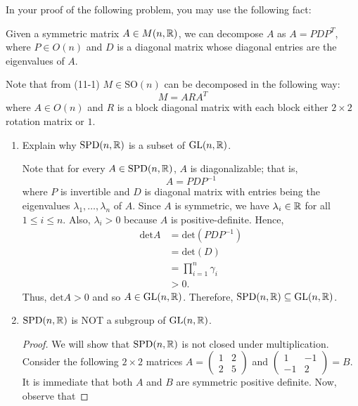 \documentclass{article}
\begin{document}
In your proof of the following problem, you may use the following fact:
\begin{theorem}[ ]
   Given a symmetric matrix \( A \in M(n,\mathbb{R}) \), we can decompose \( A  \) as \( A = P D P^{T} \), where \( P \in O(n) \) and \( D  \) is a diagonal matrix whose diagonal entries are the eigenvalues of \( A  \). 
\end{theorem}

\begin{problem}
    Note that from (11-1) \( M \in \text{SO}(n)   \) can be decomposed in the following way:
        \[ M = A R A^{T} \]
        where \( A \in O(n) \) and \( R  \) is a block diagonal matrix with each block either \( 2 \times 2  \) rotation matrix or \( 1 \).
\end{problem}
\begin{enumerate}
    \item[(a)] Explain why \( \text{SPD}(n,\mathbb{R})   \) is a subset of \( \text{GL}(n,\mathbb{R})  \).
        \begin{solution}
            Note that for every \( A \in \text{SPD}(n,\mathbb{R})   \), \( A  \) is diagonalizable; that is, 
            \[  A = P D P^{-1} \]
            where \( P  \) is invertible and \( D  \) is diagonal matrix with entries being the eigenvalues \( {\lambda}_{1}, \dots, {\lambda}_{n}  \) of \( A  \). Since \( A  \) is symmetric, we have \( {\lambda}_{i} \in \mathbb{R}  \) for all \( 1 \leq i \leq n  \). Also, \( {\lambda}_{i} > 0  \) because \( A  \) is positive-definite. Hence, 
            \begin{align*}
                \text{det}A &= \text{det}(P D P^{-1}) \\
                            &= \text{det}(D) \\
                            &= \prod_{i=1}^{n} {\gamma}_{i} \\
                            &>0.
            \end{align*}
            Thus, \( \text{det} A > 0  \) and so \( A \in \text{GL}(n,\mathbb{R})  \). Therefore, \( \text{SPD}(n,\mathbb{R}) \subseteq  \text{GL}(n,\mathbb{R})   \).
        \end{solution}
    \item[(b)] \( \text{SPD}(n,\mathbb{R})   \) is NOT a subgroup of \( \text{GL}(n,\mathbb{R})  \).
        \begin{proof}
            We will show that \( \text{SPD}(n,\mathbb{R})   \) is not closed under multiplication. Consider the following \( 2 \times 2  \) matrices \( A = \begin{pmatrix} 1 & 2 \\ 2 & 5 \end{pmatrix}  \) and \( \begin{pmatrix} 1 & - 1 \\ -1 & 2 \end{pmatrix} = B  \). It is immediate that both \( A  \) and \( B  \) are symmetric positive definite. Now, observe that 

\end{proof}
\end{enumerate}
\end{document}
